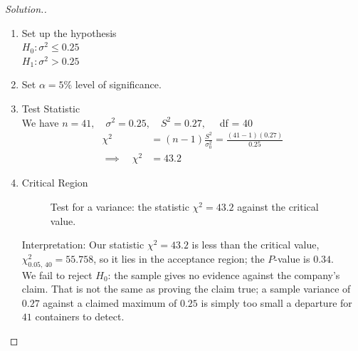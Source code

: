 \documentclass[11pt,a4paper]{article}
\theoremstyle{definition}
\newenvironment{solution}
  {\renewcommand{\qedsymbol}{}\begin{proof}[\textit{Solution}.]}
  {\end{proof}}
\begin{document}
\begin{solution}
\begin{enumerate}
\item Set up the hypothesis\\[1ex]
$H_0:\sigma^2 \leq 0.25$\\ $H_1:\sigma^2>0.25$\\
\item Set $\alpha =5\%$ level of significance.
\item Test Statistic\\
We have $n=41,\quad  \sigma^2=0.25,\quad  S^2=0.27,\quad $ df = 40
\begin{align*}
\chi^2 &=(n-1)\frac{S^2}{\sigma_0^2}=\frac{(41-1)(0.27)}{0.25}\\[1ex] \implies\quad  \chi^2 &= 43.2
\end{align*}



\item Critical Region



\begin{figure}[H]
\centering
{}
\caption{Test for a variance: the statistic $\chi^2=43.2$ against the critical value.}
\end{figure}









Interpretation: Our statistic $\chi^2=43.2$ is less than the critical value, $\chi^2_{0.05,\,40}=55.758$, so it lies in the acceptance region; the $P$-value is $0.34$.\\[1ex] We fail to reject $H_0$: the sample gives no evidence against the company's claim. That is not the same as proving the claim true; a sample variance of $0.27$ against a claimed maximum of $0.25$ is simply too small a departure for $41$ containers to detect.\\
\end{enumerate}
\end{solution}
\end{document}
